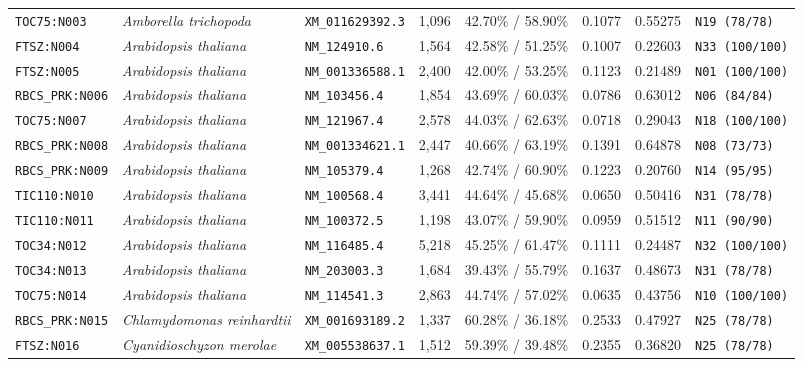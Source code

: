 \documentclass[10pt,letterpaper]{article}
\begin{document}
\begin{longtable}{llllllll}
\texttt{TOC75:N003} & \textit{Amborella trichopoda} & \texttt{XM\_011629392.3} & 1,096 & 42.70\% / 58.90\% & 0.1077 & 0.55275 & \texttt{N19 (78/78)} \\
\texttt{FTSZ:N004} & \textit{Arabidopsis thaliana} & \texttt{NM\_124910.6} & 1,564 & 42.58\% / 51.25\% & 0.1007 & 0.22603 & \texttt{N33 (100/100)} \\
\texttt{FTSZ:N005} & \textit{Arabidopsis thaliana} & \texttt{NM\_001336588.1} & 2,400 & 42.00\% / 53.25\% & 0.1123 & 0.21489 & \texttt{N01 (100/100)} \\
\texttt{RBCS\_PRK:N006} & \textit{Arabidopsis thaliana} & \texttt{NM\_103456.4} & 1,854 & 43.69\% / 60.03\% & 0.0786 & 0.63012 & \texttt{N06 (84/84)} \\
\texttt{TOC75:N007} & \textit{Arabidopsis thaliana} & \texttt{NM\_121967.4} & 2,578 & 44.03\% / 62.63\% & 0.0718 & 0.29043 & \texttt{N18 (100/100)} \\
\texttt{RBCS\_PRK:N008} & \textit{Arabidopsis thaliana} & \texttt{NM\_001334621.1} & 2,447 & 40.66\% / 63.19\% & 0.1391 & 0.64878 & \texttt{N08 (73/73)} \\
\texttt{RBCS\_PRK:N009} & \textit{Arabidopsis thaliana} & \texttt{NM\_105379.4} & 1,268 & 42.74\% / 60.90\% & 0.1223 & 0.20760 & \texttt{N14 (95/95)} \\
\texttt{TIC110:N010} & \textit{Arabidopsis thaliana} & \texttt{NM\_100568.4} & 3,441 & 44.64\% / 45.68\% & 0.0650 & 0.50416 & \texttt{N31 (78/78)} \\
\texttt{TIC110:N011} & \textit{Arabidopsis thaliana} & \texttt{NM\_100372.5} & 1,198 & 43.07\% / 59.90\% & 0.0959 & 0.51512 & \texttt{N11 (90/90)} \\
\texttt{TOC34:N012} & \textit{Arabidopsis thaliana} & \texttt{NM\_116485.4} & 5,218 & 45.25\% / 61.47\% & 0.1111 & 0.24487 & \texttt{N32 (100/100)} \\
\texttt{TOC34:N013} & \textit{Arabidopsis thaliana} & \texttt{NM\_203003.3} & 1,684 & 39.43\% / 55.79\% & 0.1637 & 0.48673 & \texttt{N31 (78/78)} \\
\texttt{TOC75:N014} & \textit{Arabidopsis thaliana} & \texttt{NM\_114541.3} & 2,863 & 44.74\% / 57.02\% & 0.0635 & 0.43756 & \texttt{N10 (100/100)} \\
\texttt{RBCS\_PRK:N015} & \textit{Chlamydomonas reinhardtii} & \texttt{XM\_001693189.2} & 1,337 & 60.28\% / 36.18\% & 0.2533 & 0.47927 & \texttt{N25 (78/78)} \\
\texttt{FTSZ:N016} & \textit{Cyanidioschyzon merolae} & \texttt{XM\_005538637.1} & 1,512 & 59.39\% / 39.48\% & 0.2355 & 0.36820 & \texttt{N25 (78/78)} \\

\end{longtable}
\end{document}
